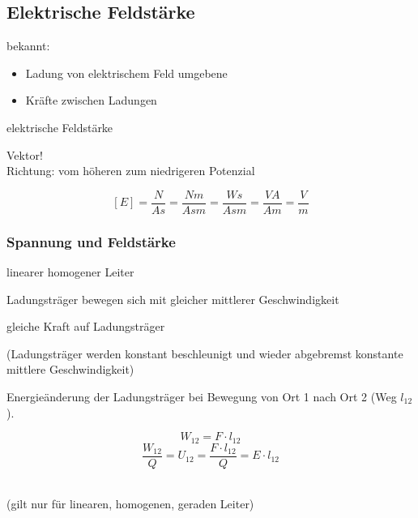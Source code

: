\subsection{Elektrische Feldstärke}

bekannt:

\begin{itemize}
	\item Ladung von elektrischem Feld umgebene
	\item Kräfte zwischen Ladungen
\end{itemize}

elektrische Feldstärke 

Vektor!\\
Richtung: vom höheren zum niedrigeren Potenzial

$$[E] = \frac{N}{As} = \frac{Nm}{Asm} = \frac{Ws}{Asm} = \frac{VA}{Am} = \frac{V}{m}$$

\subsubsection{Spannung und Feldstärke}

linearer homogener Leiter

 Ladungsträger bewegen sich mit gleicher mittlerer Geschwindigkeit

\hspace{2cm} \Ra gleiche Kraft auf Ladungsträger

(Ladungsträger werden konstant beschleunigt und wieder abgebremst \Ra konstante mittlere Geschwindigkeit)

Energieänderung der Ladungsträger bei Bewegung von Ort 1 nach Ort 2 (Weg $l_{12}$).

$$W_{12} = F \cdot l_{12}$$
$$\frac{W_{12}}{Q} = U_{12} = \frac{F \cdot l_{12}}{Q} = E \cdot l_{12}$$
\begin{center}
\\
(gilt nur für linearen, homogenen, geraden Leiter)
\end{center}

